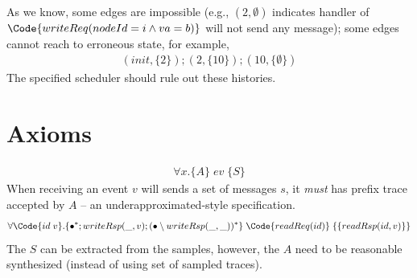 As we know, some edges are impossible (e.g., $(2, \emptyset)$ indicates handler of $\Code{writeReq(nodeId = i \land va = b)}$ will not send any message); some edges cannot reach to erroneous state, for example, 
\begin{align*}
    (init,\{2\});(2,\{10\});(10,\{\emptyset\})
\end{align*}
The specified scheduler should rule out these histories.

\section{Axioms}

\begin{align*}
    \forall x. \{A\}\;ev\;\{S\}
\end{align*}
When receiving an event $v$ will sends a set of messages $s$, it \emph{must} has prefix trace accepted by $A$ -- an underapproximated-style specification.
\begin{align*}
    \forall \Code{id\;v}. \{\bullet^*;writeRsp(\_, v);(\bullet \setminus writeRsp(\_, \_))^*\}\;\Code{readReq(id)}\;\{\{readRsp(id, v)\}\}
\end{align*}
The $S$ can be extracted from the samples, however, the $A$ need to be reasonable synthesized (instead of using set of sampled traces).
